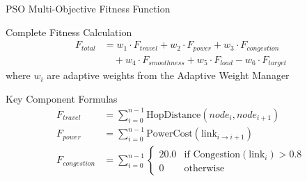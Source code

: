 \documentclass[10pt,aspectratio=169]{beamer}
\begin{document}
\begin{frame}[fragile]{PSO Multi-Objective Fitness Function}
    \begin{block}{Complete Fitness Calculation}
        \begin{align}
            F_{total} &= w_1 \cdot F_{travel} + w_2 \cdot F_{power} + w_3 \cdot F_{congestion} \\
            &\quad + w_4 \cdot F_{smoothness} + w_5 \cdot F_{load} - w_6 \cdot F_{target}
        \end{align}
        where $w_i$ are adaptive weights from the Adaptive Weight Manager
    \end{block}
    
    \begin{block}{Key Component Formulas}
        \begin{align}
            F_{travel} &= \sum_{i=0}^{n-1} \text{HopDistance}(node_i, node_{i+1}) \\
            F_{power} &= \sum_{i=0}^{n-1} \text{PowerCost}(\text{link}_{i \to i+1}) \\
            F_{congestion} &= \sum_{i=0}^{n-1} \begin{cases} 
            20.0 & \text{if } \text{Congestion}(\text{link}_i) > 0.8 \\
            0 & \text{otherwise}
            \end{cases}
        \end{align}
    \end{block}
\end{frame}
\end{document}
